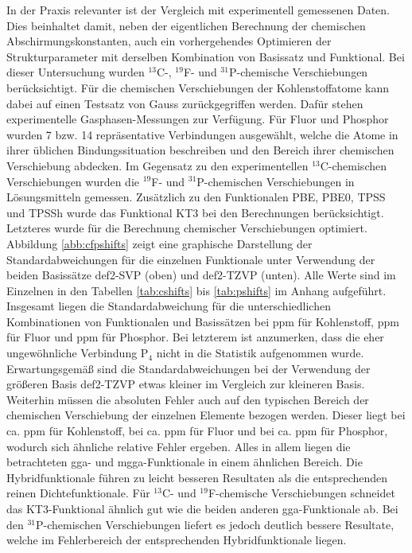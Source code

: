 \bigskip
In der Praxis relevanter ist der Vergleich mit experimentell gemessenen Daten. Dies beinhaltet damit, neben der eigentlichen Berechnung der chemischen Abschirmungskonstanten, auch ein vorhergehendes Optimieren der Strukturparameter mit derselben Kombination von Basissatz und Funktional. Bei dieser Untersuchung wurden $^{13}$C-, $^{19}$F- und $^{31}$P-chemische Verschiebungen berücksichtigt. Für die chemischen Verschiebungen der Kohlenstoffatome kann dabei auf einen Testsatz von Gauss\supercite{gauss1993effects} zurückgegriffen werden. Dafür stehen experimentelle Gasphasen-Messungen zur Verfügung.\supercite{jameson1987gas} Für Fluor und Phosphor wurden 7 bzw. 14 repräsentative Verbindungen ausgewählt, welche die Atome in ihrer üblichen Bindungssituation beschreiben und den Bereich ihrer chemischen Verschiebung abdecken. Im Gegensatz zu den experimentellen $^{13}$C-chemischen Verschiebungen wurden die $^{19}$F- und $^{31}$P-chemischen Verschiebungen in Lösungsmitteln gemessen. Zusätzlich zu den Funktionalen PBE, PBE0, TPSS und TPSSh wurde das Funktional KT3\supercite{keal2004semiempirical} bei den Berechnungen berücksichtigt. Letzteres wurde für die Berechnung chemischer Verschiebungen optimiert. Abbildung \ref{abb:cfpshifts} zeigt eine graphische Darstellung der Standardabweichungen für die einzelnen Funktionale unter Verwendung der beiden Basissätze def2-SVP (oben) und def2-TZVP (unten). Alle Werte sind im Einzelnen in den Tabellen \ref{tab:cshifts} bis \ref{tab:pshifts} im Anhang aufgeführt. Insgesamt liegen die Standardabweichung für die unterschiedlichen Kombinationen von Funktionalen und Basissätzen bei \unit[3--8]{ppm} für Kohlenstoff, \unit[5--20]{ppm} für Fluor und \unit[17--34]{ppm} für Phosphor. Bei letzterem ist anzumerken, dass die eher ungewöhnliche Verbindung P$_4$ nicht in die Statistik aufgenommen wurde. Erwartungsgemäß sind die Standardabweichungen bei der Verwendung der größeren Basis def2-TZVP etwas kleiner im Vergleich zur kleineren Basis. Weiterhin müssen die absoluten Fehler auch auf den typischen Bereich der chemischen Verschiebung der einzelnen Elemente bezogen werden. Dieser liegt bei ca. \unit[200]{ppm} für Kohlenstoff, bei ca. \unit[300]{ppm} für Fluor und bei ca. \unit[500]{ppm} für Phosphor, wodurch sich ähnliche relative Fehler ergeben. Alles in allem liegen die betrachteten \ac{gga}- und \ac{mgga}-Funktionale in einem ähnlichen Bereich. Die Hybridfunktionale führen zu leicht besseren Resultaten als die entsprechenden reinen Dichtefunktionale. Für $^{13}$C- und $^{19}$F-chemische Verschiebungen schneidet das KT3-Funktional ähnlich gut wie die beiden anderen \ac{gga}-Funktionale ab. Bei den $^{31}$P-chemischen Verschiebungen liefert es jedoch deutlich bessere Resultate, welche im Fehlerbereich der entsprechenden Hybridfunktionale liegen. 

